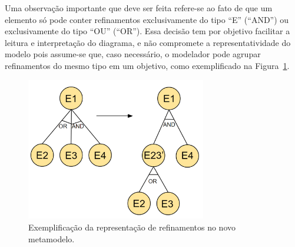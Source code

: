 Uma observação importante que deve ser feita refere-se ao fato de que um elemento só pode conter refinamentos exclusivamente do tipo ``E'' (``AND'') ou exclusivamente do tipo ``OU'' (``OR''). Essa decisão tem por objetivo facilitar a leitura e interpretação do diagrama, e não compromete a representatividade do modelo pois assume-se que, caso necessário, o modelador pode agrupar refinamentos do mesmo tipo em um objetivo, como exemplificado na Figura~\ref{figura-refinamentos}.

\begin{figure}
	\centering
	\includegraphics[width=0.7\textwidth]{figuras/metamodelos/exemplo-or-and.png}
	\caption{Exemplificação da representação de refinamentos no novo metamodelo.}
	\label{figura-refinamentos}
\end{figure}


